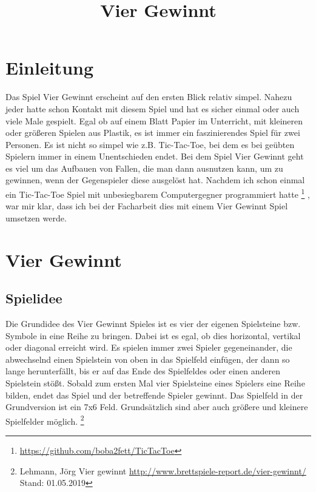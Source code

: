 \documentclass[12pt,a4paper,ngerman]{article}
\title{Vier Gewinnt}
\author{}
\begin{document}
	\maketitle
	\newpage
	\tableofcontents
	\newpage
	\section{Einleitung}
	Das Spiel \glqq Vier Gewinnt\grqq{} erscheint auf den ersten Blick relativ simpel. Nahezu jeder hatte schon Kontakt mit diesem Spiel und hat es sicher einmal oder auch viele Male gespielt. Egal ob auf einem Blatt Papier im Unterricht, mit kleineren oder größeren Spielen aus Plastik, es ist immer ein faszinierendes Spiel für zwei Personen. Es ist nicht so simpel wie z.B. Tic-Tac-Toe, bei dem es bei geübten Spielern immer in einem Unentschieden endet. Bei dem Spiel \glqq Vier Gewinnt\grqq{} geht es viel um das Aufbauen von Fallen, die man dann ausnutzen kann, um zu gewinnen, wenn der Gegenspieler diese ausgelöst hat. Nachdem ich schon einmal ein \glqq Tic-Tac-Toe\grqq{} Spiel mit unbesiegbarem Computergegner programmiert hatte
	\footnote{\url{https://github.com/boba2fett/TicTacToe}}
	, war mir klar, dass ich bei der Facharbeit dies mit einem  \glqq Vier Gewinnt\grqq{} Spiel umsetzen werde.
	\section{Vier Gewinnt}
	\subsection{Spielidee}
	Die Grundidee des \glqq Vier Gewinnt\grqq{} Spieles ist es vier der eigenen Spielsteine bzw. Symbole in eine Reihe zu bringen.
	Dabei ist es egal, ob dies horizontal, vertikal oder diagonal erreicht wird.
	Es spielen immer zwei Spieler gegeneinander, die abwechselnd einen Spielstein von oben in das Spielfeld einfügen, der dann so lange herunterfällt, bis er auf das Ende des Spielfeldes oder einen anderen Spielstein stößt.
	Sobald zum ersten Mal vier Spielsteine eines Spielers eine Reihe bilden, endet das Spiel und der betreffende Spieler gewinnt.
	Das Spielfeld in der Grundversion ist ein 7x6 Feld. Grundsätzlich sind aber auch größere und kleinere Spielfelder möglich.
	\footnote{Lehmann, Jörg \glqq Vier gewinnt\grqq{} \url{http://www.brettspiele-report.de/vier-gewinnt/} Stand: 01.05.2019}
\end{document}
